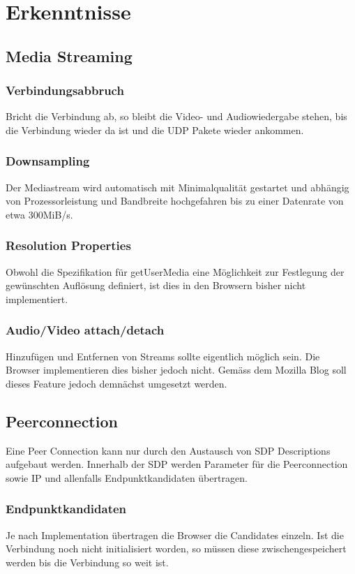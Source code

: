 \chapter{Erkenntnisse}
	\section{Media Streaming}
		\subsection{Verbindungsabbruch}
			Bricht die Verbindung ab, so bleibt die Video- und Audiowiedergabe stehen, bis die Verbindung wieder da ist und die UDP Pakete wieder ankommen.
		
		\subsection{Downsampling}
	 		Der Mediastream wird automatisch mit Minimalqualität gestartet und abhängig von Prozessorleistung und Bandbreite hochgefahren bis zu einer Datenrate von etwa 300MiB/s.
	 		
	 	\subsection{Resolution Properties}
	 		Obwohl die Spezifikation für getUserMedia eine Möglichkeit zur Festlegung der gewünschten Auflösung definiert, ist dies in den Browsern bisher nicht implementiert.
	 		
	 	\subsection{Audio/Video attach/detach}
	 		Hinzufügen und Entfernen von Streams sollte eigentlich möglich sein. Die Browser implementieren dies bisher jedoch nicht. Gemäss dem Mozilla Blog soll dieses Feature jedoch demnächst umgesetzt werden.	 	
	 	
	 \section{Peerconnection}
	 	Eine Peer Connection kann nur durch den Austausch von SDP Descriptions aufgebaut werden. Innerhalb der SDP werden Parameter für die Peerconnection sowie IP und allenfalls Endpunktkandidaten übertragen. 
	 	
	 	\subsection{Endpunktkandidaten}
			Je nach Implementation übertragen die Browser die Candidates einzeln. Ist die Verbindung noch nicht initialisiert worden, so müssen diese zwischengespeichert werden bis die Verbindung so weit ist.

